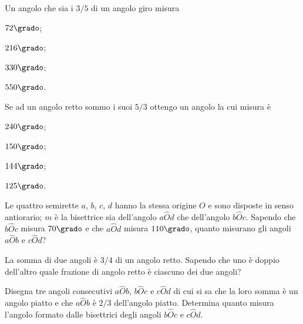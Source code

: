 \begin{multicols}{2}
\begin{esercizio}
\label{ese:1.112}
Un angolo che sia i \(3/5\) di un angolo giro misura
\begin{multicols}{2}
\begin{enumeratea}
\item \(72\grado\);	\item \(216\grado\);	\item 
\(330\grado\);	\item \(550\grado\).
\end{enumeratea}
\end{multicols}
\end{esercizio}

\begin{esercizio}
\label{ese:1.113}
Se ad un angolo retto sommo i suoi \(5/3\) ottengo un angolo la cui 
misura è
\begin{multicols}{2}
\begin{enumeratea}
\item \(240\grado\);	\item \(150\grado\);	\item 
\(144\grado\);	\item \(125\grado\).
\end{enumeratea}
\end{multicols}
\end{esercizio}
	
\begin{esercizio}
\label{ese:1.114}
Le quattro semirette \(a\), \(b\), \(c\), \(d\) hanno la stessa origine \(O\) e 
sono disposte in senso antiorario; \(m\) è la bisettrice sia 
dell'angolo \(a\widehat{O}d\) che dell'angolo \(b\widehat{O}c\). Sapendo 
che \(b\widehat{O}c\) misura \(70\grado\) e che \(a\widehat{O}d\) misura 
\(110\grado\), quanto misurano gli angoli \(a\widehat{O}b\) e 
\(c\widehat{O}d\)?
\end{esercizio}

\begin{esercizio}
\label{ese:1.115}
La somma di due angoli è \(3/4\) di un angolo retto. Sapendo che uno è 
doppio dell'altro quale frazione di angolo retto è ciascuno dei due 
angoli?
\end{esercizio}

\begin{esercizio}
\label{ese:1.116}
Disegna tre angoli consecutivi \(a\widehat{O}b\), \(b\widehat{O}c\) e 
\(c\widehat{O}d\) di cui si sa che la loro somma è un angolo piatto e 
che \(a\widehat{O}b\) è \(2/3\) dell'angolo piatto. Determina quanto 
misura l'angolo formato dalle bisettrici degli angoli \(b\widehat{O}c\) 
e \(c\widehat{O}d\).
\end{esercizio}


\end{multicols}
